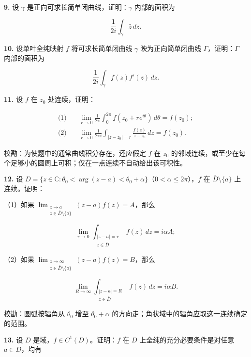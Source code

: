 \documentclass[11pt,a4paper]{article}
\begin{document}
\par{}
\noindent\textbf{9.} 设 \(\gamma\) 是正向可求长简单闭曲线，证明：\(\gamma\)
内部的面积为

\[
\frac1{2i}\int_\gamma\bar z\,dz.
\]

\par{}
\noindent\textbf{10.} 设单叶全纯映射 \(f\) 将可求长简单闭曲线 \(\gamma\)
映为正向简单闭曲线 \(\Gamma\)，证明：\(\Gamma\) 内部的面积为

\[
\frac1{2i}\int_\gamma\overline{f(z)}f'(z)\,dz.
\]

\par{}
\noindent\textbf{11.} 设 \(f\) 在 \(z_0\) 处连续，证明：

\[
\begin{aligned}
\text{(1)}\quad&\lim_{r\to0}\frac1{2\pi}\int_0^{2\pi}f(z_0+re^{i\theta})\,d\theta=f(z_0);\\
\text{(2)}\quad&\lim_{r\to0}\frac1{2\pi i}\int_{|z-z_0|=r}\frac{f(z)}{z-z_0}\,dz=f(z_0).
\end{aligned}
\]

校勘：为使题中的通常曲线积分存在，还应假定 \(f\) 在 \(z_0\)
的邻域连续，或至少在每个足够小的圆周上可积；仅在一点连续不自动给出该可积性。

\par{}
\noindent\textbf{12.} 设
\(D=\{z\in\mathbb C:\theta_0<\arg(z-a)<\theta_0+\alpha\}\)（\(0<\alpha\le2\pi\)），\(f\)
在 \(\overline D\setminus\{a\}\) 上连续。证明：

（1）如果
\(\displaystyle\lim_{\substack{z\to a\\z\in\overline D\setminus\{a\}}}(z-a)f(z)=A\)，那么

\[
\lim_{r\to0}\int_{\substack{|z-a|=r\\z\in\overline D}}f(z)\,dz=i\alpha A;
\]

（2）如果
\(\displaystyle\lim_{\substack{z\to\infty\\z\in\overline D\setminus\{a\}}}(z-a)f(z)=B\)，那么

\[
\lim_{R\to\infty}\int_{\substack{|z-a|=R\\z\in\overline D}}f(z)\,dz=i\alpha B.
\]

校勘：圆弧按辐角从 \(\theta_0\) 增至 \(\theta_0+\alpha\)
的方向走；角状域中的辐角应取这一连续确定的范围。

\par{}
\noindent\textbf{13.} 设 \(D\) 是域，\(f\in C^1(D)\)。证明：\(f\) 在 \(D\)
上全纯的充分必要条件是对任意 \(a\in D\)，均有
\end{document}

